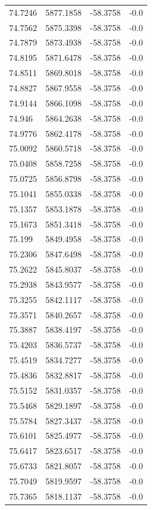\begin{table}[H]
\begin{tabular}{llll}
74.7246 & 5877.1858 & -58.3758 & -0.0 \\
74.7562 & 5875.3398 & -58.3758 & -0.0 \\
74.7879 & 5873.4938 & -58.3758 & -0.0 \\
74.8195 & 5871.6478 & -58.3758 & -0.0 \\
74.8511 & 5869.8018 & -58.3758 & -0.0 \\
74.8827 & 5867.9558 & -58.3758 & -0.0 \\
74.9144 & 5866.1098 & -58.3758 & -0.0 \\
74.946 & 5864.2638 & -58.3758 & -0.0 \\
74.9776 & 5862.4178 & -58.3758 & -0.0 \\
75.0092 & 5860.5718 & -58.3758 & -0.0 \\
75.0408 & 5858.7258 & -58.3758 & -0.0 \\
75.0725 & 5856.8798 & -58.3758 & -0.0 \\
75.1041 & 5855.0338 & -58.3758 & -0.0 \\
75.1357 & 5853.1878 & -58.3758 & -0.0 \\
75.1673 & 5851.3418 & -58.3758 & -0.0 \\
75.199 & 5849.4958 & -58.3758 & -0.0 \\
75.2306 & 5847.6498 & -58.3758 & -0.0 \\
75.2622 & 5845.8037 & -58.3758 & -0.0 \\
75.2938 & 5843.9577 & -58.3758 & -0.0 \\
75.3255 & 5842.1117 & -58.3758 & -0.0 \\
75.3571 & 5840.2657 & -58.3758 & -0.0 \\
75.3887 & 5838.4197 & -58.3758 & -0.0 \\
75.4203 & 5836.5737 & -58.3758 & -0.0 \\
75.4519 & 5834.7277 & -58.3758 & -0.0 \\
75.4836 & 5832.8817 & -58.3758 & -0.0 \\
75.5152 & 5831.0357 & -58.3758 & -0.0 \\
75.5468 & 5829.1897 & -58.3758 & -0.0 \\
75.5784 & 5827.3437 & -58.3758 & -0.0 \\
75.6101 & 5825.4977 & -58.3758 & -0.0 \\
75.6417 & 5823.6517 & -58.3758 & -0.0 \\
75.6733 & 5821.8057 & -58.3758 & -0.0 \\
75.7049 & 5819.9597 & -58.3758 & -0.0 \\
75.7365 & 5818.1137 & -58.3758 & -0.0 \\

\end{tabular}
\end{table}
